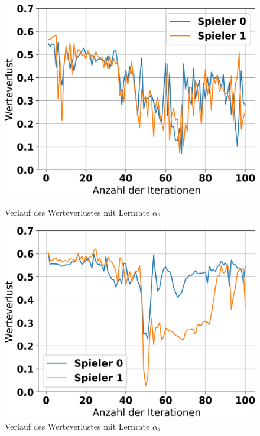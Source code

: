 \begin{figure}[H]
	\begin{minipage}[c]{0.32\linewidth}
		\includegraphics[width=\linewidth]{Bilder/ensemble-training/d_0_00003/graph_value_losses.png}
		\caption{Verlauf des Werteverlustes mit Lernrate $\alpha_3$}
	\end{minipage}
	\hfill
	\begin{minipage}[c]{0.32\linewidth}
		\includegraphics[width=\linewidth]{Bilder/ensemble-training/e_0_00001/graph_value_losses.png}
		\caption{Verlauf des Werteverlustes mit Lernrate $\alpha_4$}
	\end{minipage}
	\hfill
	\begin{minipage}[c]{0.32\linewidth}
		\makebox[\linewidth][r]{}
	\end{minipage}
\end{figure}

